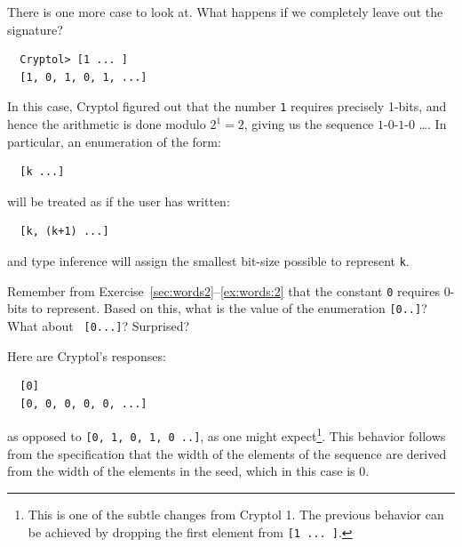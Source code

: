There is one more case to look at. What happens if we completely leave
out the signature?
\begin{Verbatim}
  Cryptol> [1 ... ]
  [1, 0, 1, 0, 1, ...]
\end{Verbatim}
In this case, Cryptol figured out that the number {\tt 1} requires
precisely 1-bits, and hence the arithmetic is done modulo $2^1 = 2$,
giving us the sequence $1$-$0$-$1$-$0$ \ldots. In particular, an
enumeration of the form:
\begin{Verbatim}
  [k ...]
\end{Verbatim}
will be treated as if the user has written:
\begin{Verbatim}
  [k, (k+1) ...]
\end{Verbatim}
and type inference will assign the smallest bit-size possible to
represent {\tt k}.  

\begin{Exercise}\label{ex:arith:9}
  Remember from Exercise~\ref{sec:words2}--\ref{ex:words:2} that the
  constant {\tt 0} requires 0-bits to represent. Based on this, what
  is the value of the enumeration {\tt [0..]}? What about {\tt
    [0...]}? Surprised?
\end{Exercise}
\begin{Answer}
Here are Cryptol's responses:\indModular\indEnum\indInfSeq
\begin{Verbatim}
  [0]
  [0, 0, 0, 0, 0, ...]
\end{Verbatim}
as opposed to {\tt [0, 1, 0, 1, 0 ..]}, as one might
expect\footnote{This is one of the subtle changes from Cryptol 1. The
  previous behavior can be achieved by dropping the first element from
  {\tt [1 ... ]}.}.  This behavior follows from the specification that
the width of the elements of the sequence are derived from the width of
the elements in the seed, which in this case is 0.
\end{Answer}

